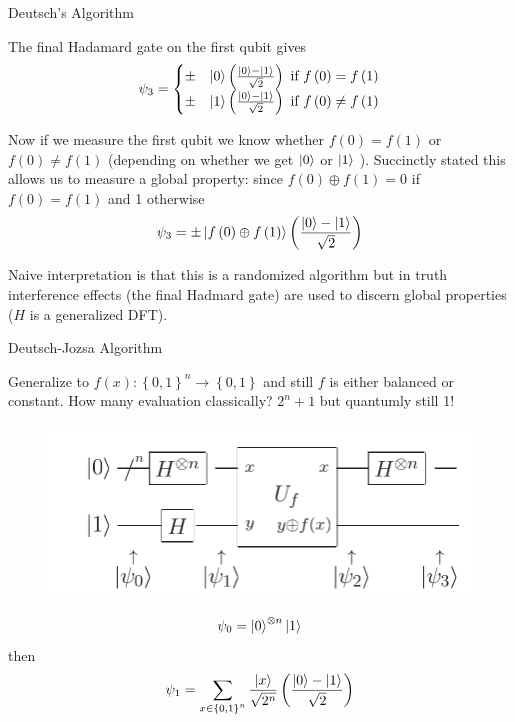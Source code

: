 \documentclass{beamer}
\begin{document}
\begin{frame}{Deutsch's Algorithm}

The final Hadamard gate on the first qubit gives
\[
\psi_{3}=\begin{cases}
\pm & \Ket{0}\left(\frac{\Ket{0}-\Ket{1}}{\sqrt{2}}\right)\text{ if }f\left(0\right)=f\left(1\right)\\
\pm & \Ket{1}\left(\frac{\Ket{0}-\Ket{1}}{\sqrt{2}}\right)\text{ if }f\left(0\right)\neq f\left(1\right)
\end{cases}
\]

Now if we measure the first qubit we know whether $f\left(0\right)=f\left(1\right)$
or $f\left(0\right)\neq f\left(1\right)$ (depending on whether we get $\Ket{0}$ or $\Ket{1}$ ). Succinctly stated this allows us to measure a global property: since $f\left(0\right)\oplus f\left(1\right)=0$ if $f\left(0\right)=f\left(1\right)$ and 1 otherwise
\[
\psi_{3}=\pm\Ket{f\left(0\right)\oplus f\left(1\right)}\left(\frac{\Ket{0}-\Ket{1}}{\sqrt{2}}\right)
\] 

Naive interpretation is that this is a randomized algorithm but in truth interference effects (the final Hadmard gate)
are used to discern global properties ($H$ is a generalized DFT).
 

\end{frame}

\begin{frame}{Deutsch-Jozsa Algorithm}

Generalize to $f\left(x\right):\left\{ 0,1\right\} ^{n}\to\left\{ 0,1\right\} $ and still $f$ is either balanced or constant.
How many evaluation classically? $2^n+1$ but quantumly still 1!
 
\begin{figure}[ht]
  \includegraphics[scale=0.33]{pasted2}
\end{figure}

\[
\psi_{0}=\Ket{0}^{\otimes n}\Ket{1}
\]
 then 
\[
\psi_{1}=\sum_{x\in\left\{ 0,1\right\} ^{n}}\frac{\Ket{x}}{\sqrt{2^{n}}}\left(\frac{\Ket{0}-\Ket{1}}{\sqrt{2}}\right)
\]

\end{frame}
\end{document}
